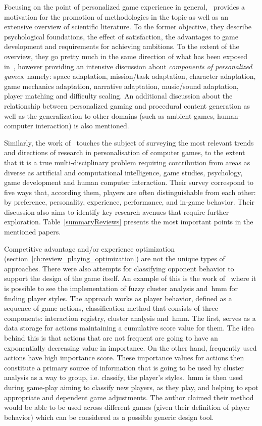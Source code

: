 Focusing on the point of personalized game experience in general,~\cite{bakkes_personalised_2012} provides a motivation for the promotion of methodologies in the topic as well as an extensive overview of scientific literature. To the former objective, they describe psychological foundations, the effect of satisfaction, the advantages to game development and requirements for achieving ambitions. To the extent of the overview, they go pretty much in the same direction of what has been exposed in~\cite{bakkes_player_2012}, however providing an intensive discussion about \textit{components of personalized games}, namely: space adaptation, mission/task adaptation, character adaptation, game mechanics adaptation, narrative adaptation, music/sound adaptation, player matching and difficulty scaling. An additional discussion about the relationship between personalized gaming and procedural content generation as well as the generalization to other domains (such as ambient games, human-computer interaction) is also mentioned.

Similarly, the work of~\cite{karpinskyj_video_2014} touches the subject of surveying the most relevant trends and directions of research in personalisation of computer games, to the extent that it is a true multi-disciplinary problem requiring contribution from areas as diverse as artificial and computational intelligence, game studies, psychology, game development and human computer interaction. Their survey correspond to five ways that, according them, players are often distinguishable from each other: by preference, personality, experience, performance, and in-game behavior. Their discussion also aims to identify key research avenues that require further exploration. Table~\ref{summaryReviews} presents the most important points in the mentioned papers. 

Competitive advantage and/or experience optimization (section~\ref{ch:review_playing_optimization}) 
are not the unique types of approaches. There were also attempts for classifying opponent behavior to support the design of the game itself. An example of this is the work of~\cite{etheredge_generic_2013} where it is possible to see the implementation of fuzzy cluster analysis and~\gls{hmm} for finding player styles. The approach works as  player behavior, defined as a sequence of game actions, classification method that consists of three components: interaction registry, cluster analysis and~\gls{hmm}. The first, serves as a data storage for actions maintaining a cumulative score value for them. The idea behind this is that actions that are not frequent are going to have an exponentially decreasing value in importance. On the other hand, frequently used actions have high importance score. These importance values for actions then constitute a primary source of information that is going to be used by cluster analysis as a way to group, i.e. classify, the player's styles.~\gls{hmm} is then used during game-play aiming to classify new players, as they play, and helping to spot appropriate and dependent game adjustments. The author claimed their method would be able to be used across different games (given their definition of player behavior) which can be considered as a possible generic design tool.

